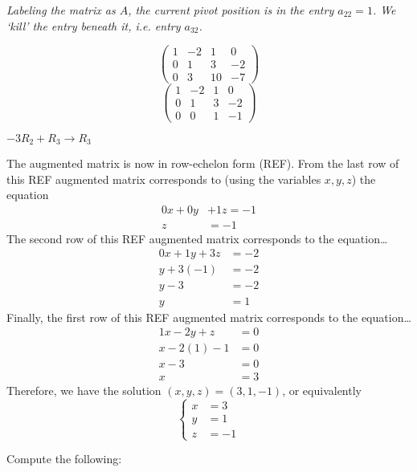 \documentclass[12pt,letterpaper]{exam}
\begin{document}
\begin{questions}
{\itshape Labeling the matrix as $A$, the current pivot position is in the entry $a_{22}= 1$. We `kill' the entry beneath it, i.e. entry $a_{32}$. 
\begin{minipage}[t]{0.1\textwidth}
	\[
	\begin{pmatrix}
	1 & -2 & 1 & 0 \\
	0 & 1 & 3 & -2 \\
	0 & 3 & 10 & -7
	\end{pmatrix}
	\]
	\[
	\begin{pmatrix}
	1 & -2 & 1 & 0 \\
	0 & 1 & 3 & -2 \\
	0 & 0 & 1 & -1
	\end{pmatrix}
	\]
\end{minipage}\begin{minipage}[t]{0.8\textwidth}
\pvspace{1.8cm}\hspace{3cm} $-3R_2 + R_3 \to R_3$
\end{minipage} \pspace
The augmented matrix is now in row-echelon form (REF). From the last row of this REF augmented matrix corresponds to (using the variables $x, y, z$) the equation 
	\[
	\begin{aligned}
	0x + 0y &+ 1z= -1 \\
	z&= -1
	\end{aligned}
	\]
The second row of this REF augmented matrix corresponds to the equation\dots
	\[
	\begin{aligned}
	0x + 1y + 3z&= -2 \\
	y + 3(-1)&= -2 \\
	y - 3&= -2 \\
	y&= 1
	\end{aligned}
	\]
Finally, the first row of this REF augmented matrix corresponds to the equation\dots
	\[
	\begin{aligned}
	1x - 2y + z&= 0 \\
	x - 2(1) - 1&= 0 \\
	x - 3&= 0 \\
	x&= 3
	\end{aligned}
	\]
Therefore, we have the solution $(x, y, z)= (3, 1, -1)$, or equivalently
	\[
	\left\{
	\begin{aligned}
	x&= 3 \\
	y&= 1 \\
	z&= -1
	\end{aligned} \right.
	\]
}



\newpage
\question Compute the following:
	\begin{parts}

\end{parts}
\end{questions}
\end{document}
